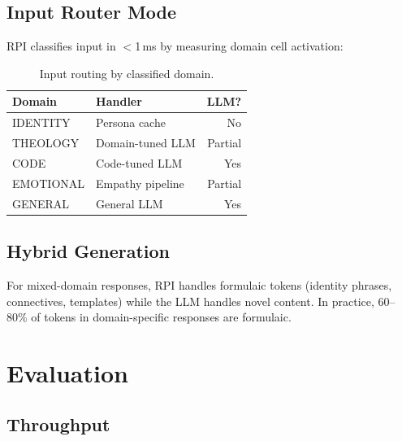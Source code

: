\documentclass[10pt,twocolumn]{article}
\begin{document}
\subsection{Input Router Mode}

RPI classifies input in $<$1\,ms by measuring domain cell activation:

\begin{table}[h]
\centering
\small
\begin{tabular}{llr}
\toprule
\textbf{Domain} & \textbf{Handler} & \textbf{LLM?} \\
\midrule
IDENTITY & Persona cache & No \\
THEOLOGY & Domain-tuned LLM & Partial \\
CODE & Code-tuned LLM & Yes \\
EMOTIONAL & Empathy pipeline & Partial \\
GENERAL & General LLM & Yes \\
\bottomrule
\end{tabular}
\caption{Input routing by classified domain.}
\label{tab:routing}
\end{table}

\subsection{Hybrid Generation}

For mixed-domain responses, RPI handles formulaic tokens (identity phrases, connectives, templates) while the LLM handles novel content. In practice, 60--80\% of tokens in domain-specific responses are formulaic.

\section{Evaluation}
\label{sec:eval}

\subsection{Throughput}
\end{document}
